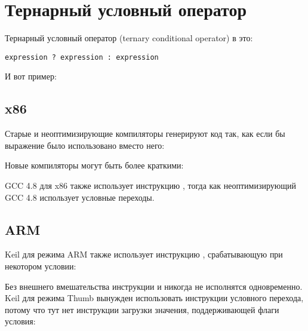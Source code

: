 \section{Тернарный условный оператор}
\label{chap:cond}

Тернарный условный оператор (ternary conditional operator) в \CCpp это:

\begin{lstlisting}
expression ? expression : expression
\end{lstlisting}

И вот пример:



\subsection{x86}

Старые и неоптимизирующие компиляторы генерируют код так, как если бы выражение  было использовано
вместо него:





Новые компиляторы могут быть более краткими:



\Optimizing GCC 4.8 для x86 также использует инструкцию ,
тогда как неоптимизирующий GCC 4.8 использует условные переходы.

\subsection{ARM}

\Optimizing Keil для режима ARM также использует инструкцию , срабатывающую при некотором
условии:



Без внешнего вмешательства инструкции  и  никогда не исполнятся одновременно.
\Optimizing Keil для режима Thumb вынужден использовать инструкции условного перехода, потому
что тут нет инструкции загрузки значения, поддерживающей флаги условия:

